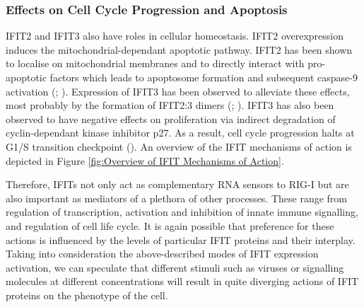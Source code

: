 \subsubsection{Effects on Cell Cycle Progression and Apoptosis} \label{Effects on Cell Cycle Progression and Apoptosis}
IFIT2 and IFIT3 also have roles in cellular homeostasis. IFIT2 overexpression induces the mitochondrial-dependant apoptotic pathway. IFIT2 has been shown to localise on mitochondrial membranes and to directly interact with pro-apoptotic factors which leads to apoptosome formation and subsequent caspase-9 activation (\cite{Chen2017InhibitionApoptosis}; \cite{Diamond2013TheProteins}). Expression of IFIT3 has been observed to alleviate these effects, most probably by the formation of IFIT2:3 dimers (\cite{Mears2018BetterResponse}; \cite{Stawowczyk2011TheApoptosis}). IFIT3 has also been observed to have negative effects on proliferation via indirect degradation of cyclin-dependant kinase inhibitor p27. As a result, cell cycle progression halts at G1/S transition checkpoint (\cite{Xiao2006RIG-GProteins}). An overview of the IFIT mechanisms of action is depicted in Figure \ref{fig:Overview of IFIT Mechanisms of Action}.

Therefore, IFITs not only act as complementary RNA sensors to RIG-I but are also important as mediators of a plethora of other processes. These range from regulation of transcription, activation and inhibition of innate immune signalling, and regulation of cell life cycle. It is again possible that preference for these actions is influenced by the levels of particular IFIT proteins and their interplay. Taking into consideration the above-described modes of IFIT expression activation, we can speculate that different stimuli such as viruses or signalling molecules at different concentrations will result in quite diverging actions of IFIT proteins on the phenotype of the cell.

